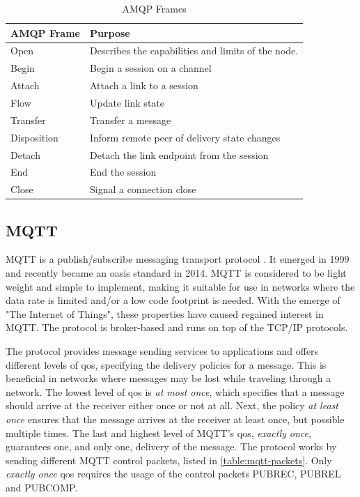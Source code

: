 \begin{table}[h]
\begin{tabularx}{\textwidth}{| X | X |}
\hline
  \textbf{AMQP Frame} & \textbf{Purpose} \\ \hline
  Open & Describes the capabilities and limits of the node. \\ \hline
  Begin & Begin a session on a channel \\ \hline
  Attach & Attach a link to a session \\ \hline
  Flow & Update link state \\ \hline
  Transfer & Transfer a message \\ \hline
  Disposition & Inform remote peer of delivery state changes \\ \hline
  Detach & Detach the link endpoint from the session \\ \hline
  End & End the session\\ \hline
  Close & Signal a connection close\\ \hline
\end{tabularx}
\caption{AMQP Frames}
\label{table-amqp-frames}
\end{table}

\subsection{MQTT}

MQTT is a publish/subscribe messaging transport protocol \cite{oasis-mqtt}.  It
emerged in 1999 and recently became an \gls{oasis} standard in 2014. MQTT is
considered to be light weight and simple to implement, making it suitable for
use in networks where the data rate is limited and/or a low code footprint is
needed. With the emerge of "The Internet of Things", these properties have
caused regained interest in MQTT. The protocol is broker-based and runs on top
of the TCP/IP protocols.

The protocol provides message sending services to applications and offers
different levels of \gls{qos}, specifying the delivery policies for a message.
This is beneficial in networks where messages may be lost while traveling
through a network. The lowest level of \gls{qos} is \textit{at most once}, which
specifies that a message should arrive at the receiver either once or not at
all. Next, the policy \textit{at least once} ensures that the message arrives at
the receiver at least once, but possible multiple times. The last and highest
level of MQTT's \gls{qos}, \textit{exactly once}, guarantees one, and only one,
delivery of the message. The protocol works by sending different MQTT control
packets, listed in \cref{table:mqtt-packets}. Only \textit{exactly once}
\gls{qos} requires the usage of the control packets PUBREC, PUBREL and PUBCOMP.

